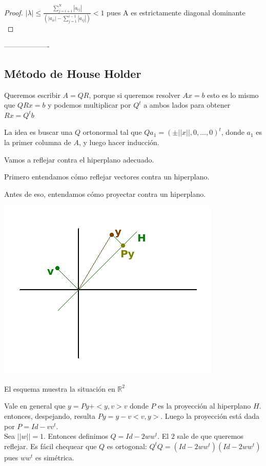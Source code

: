 \documentclass[10pt,a4paper,final]{report}
\def\R{\mathbb{R}}
\begin{document}
{\begin{proof}
$|\lambda| \leq \frac{\displaystyle \sum_{j=i+1}^N |a_{ij}|}{(|a_{ii}| - \displaystyle \sum_{j=1}^{i-1} |a_{ij}|)}<1$ pues A es estrictamente diagonal dominante\\

\end{proof}
-------------------


\subsection{Método de House Holder}

Queremos escribir $A=QR$, porque si queremos resolver $Ax = b$ esto es lo mismo que $QRx = b$ y podemos multiplicar por $Q^t$ a ambos lados para obtener $Rx = Q^t b$

La idea es buscar una $Q$ ortonormal tal que $Qa_1 = (\pm ||x||,0,...,0)^t$, donde $a_1$ es la primer columna de $A$, y luego hacer inducción.

Vamos a reflejar contra el hiperplano adecuado.


Primero entendamos cómo reflejar vectores contra un hiperplano.

Antes de eso, entendamos cómo proyectar contra un hiperplano.

\includegraphics[scale=1]{householder1.png}
\caption{El esquema muestra la situación en $\R^2$}

Vale en general que $y=Py + <y,v> v$ donde $P$ es la proyección al hiperplano $H$. entonces, despejando, resulta $Py = y-v<v,y>$. Luego la proyección está dada por $P=Id-vv^t$.\\

Sea $||w||=1$. Entonces definimos $Q=Id-2ww^t$. El $2$ sale de que queremos reflejar. Es fácil chequear que $Q$ es ortogonal: $Q^t Q = (Id - 2 w w^t) (Id - 2 w w^t)$ pues $w w^t$ es simétrica.\\

}
\end{document}
